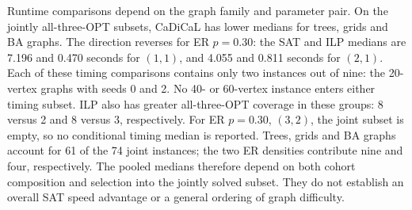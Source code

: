\begin{table}[htbp]
\centering\small
\caption{Coverage and conditional runtime by family.}
\label{tab:family-runtime}

\end{table}

Runtime comparisons depend on the graph family and parameter pair.
On the jointly all-three-OPT subsets, CaDiCaL has lower medians for
trees, grids and BA graphs. The direction reverses for ER $p=0.30$:
the SAT and ILP medians are 7.196 and 0.470 seconds for $(1,1)$, and
4.055 and 0.811 seconds for $(2,1)$. Each of these timing comparisons
contains only two instances out of nine: the 20-vertex graphs with
seeds 0 and 2. No 40- or 60-vertex instance enters either timing subset.
ILP also has greater
all-three-OPT coverage in these groups: 8 versus 2 and 8 versus 3,
respectively. For ER $p=0.30$, $(3,2)$, the joint subset is empty,
so no conditional timing median is reported.
Trees, grids and BA graphs account for 61 of the 74 joint instances;
the two ER densities contribute nine and four, respectively.
The pooled medians therefore depend on both cohort composition and
selection into the jointly solved subset. They do not establish an
overall SAT speed advantage or a general ordering of graph difficulty.
